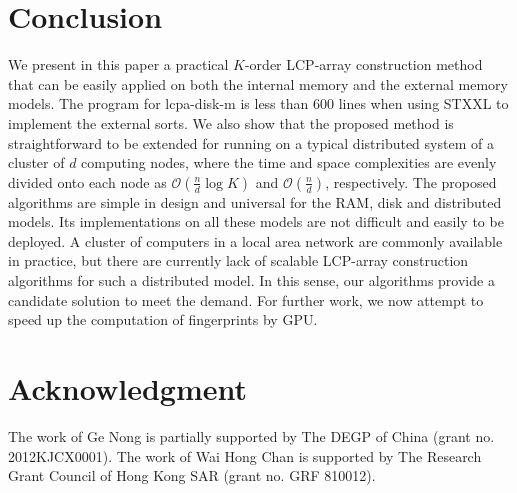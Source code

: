 \documentclass[10pt,journal,compsoc]{IEEEtran}
\begin{document}
\begin{CJK*}{GBK}{song}
\section{Conclusion}\label{sec:conclusion}

We present in this paper a practical $K$-order LCP-array construction method that can be easily applied on both the internal memory and the external memory models. The program for lcpa-disk-m is less than 600 lines when using STXXL to implement the external sorts. We also show that the proposed method is straightforward to be extended for running on a typical distributed system of a cluster of $d$ computing nodes, where the time and space complexities are evenly divided onto each node as $\mathcal{O}(\frac{n}{d}\log K)$ and $\mathcal{O}(\frac{n}{d})$, respectively. The proposed algorithms are simple in design and universal for the RAM, disk and distributed models. Its implementations on all these models are not difficult and easily to be deployed.
A cluster of computers in a local area network are commonly available in practice, but there are currently lack of scalable LCP-array construction algorithms for such a distributed model. In this sense, our algorithms provide a candidate solution to meet the demand. For further work, we now attempt to speed up the computation of fingerprints by GPU.

\section*{Acknowledgment}
The work of Ge Nong is partially supported by The DEGP of China (grant no. 2012KJCX0001). The work of Wai Hong Chan is supported by The Research Grant Council of Hong Kong SAR (grant no. GRF 810012).




\end{CJK*}
\end{document}
